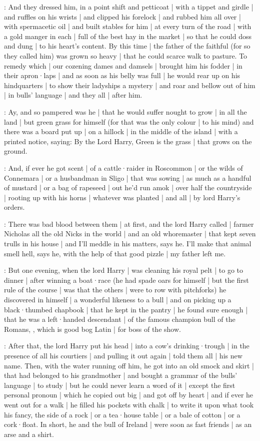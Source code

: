 \madden:
And they dressed him,
in a point shift and petticoat |
with a tippet and girdle |
and ruffles on his wrists |
and clipped his forelock |
and rubbed him all over |
with spermacetic oil |
and built stables for him |
at every turn of the road |
with a gold manger in each |
full of the best hay in the market |
so that he could doss and dung |
to his heart's content.
By this time |
the father of the faithful
(for so they called him)
was grown so heavy |
that he could scarce walk to pasture.
To remedy which |
our cozening dames and damsels |
brought him his fodder |
in their apron·laps |
and as soon as his belly was full |
he would rear up on his hindquarters |
to show their ladyships a mystery |
and roar and bellow out of him |
in bulls' language |
and they all |
after him.

\lenehan:
Ay,
and so pampered was he |
that he would suffer nought to grow |
in all the land |
but green grass for himself
(for that was the only colour |
to his mind)
and there was a board put up |
on a hillock |
in the middle of the island |
with a printed notice,
saying:
By the Lord Harry,
Green is the grass |
that grows on the ground.

\dixon:
And,
if ever he got scent |
of a cattle·raider in Roscommon |
or the wilds of Connemara |
or a husbandman in Sligo |
that was sowing |
as much as a handful of mustard |
or a bag of rapeseed |
out he'd run amok |
over half the countryside |
rooting up with his horns |
whatever was planted |
and all |
by lord Harry's orders.

\lynch:
There was bad blood between them |
at first,
and the lord Harry called |
farmer Nicholas all the old Nicks in the world |
and an old whoremaster |
that kept seven trulls in his house |
and I'll meddle in his matters,
says he.
I'll make that animal smell hell,
says he,
with the help of that good pizzle |
my father left me.

\dixon:
But one evening,
when the lord Harry |
was cleaning his royal pelt |
to go to dinner |
after winning a boat·race
(he had spade oars for himself |
but the first rule of the course |
was that the others |
were to row with pitchforks)
he discovered in himself |
a wonderful likeness to a bull |
and on picking up a black·thumbed chapbook |
that he kept in the pantry |
he found sure enough |
that he was a left·handed descendant |
of the famous champion bull of the Romans,
,
which is good bog Latin |
for boss of the show.

\lynch:
After that,
the lord Harry put his head |
into a cow's drinking·trough |
in the presence of all his courtiers |
and pulling it out again |
told them all |
his new name.
Then,
with the water running off him,
he got into an old smock and skirt |
that had belonged to his grandmother |
and bought a grammar of the bulls' language |
to study |
but he could never learn a word of it |
except the first personal pronoun |
which he copied out big |
and got off by heart |
and if ever he went out for a walk |
he filled his pockets with chalk |
to write it upon what took his fancy,
the side of a rock |
or a tea·house table |
or a bale of cotton |
or a cork·float.
In short,
he and the bull of Ireland |
were soon as fast friends |
as an arse and a shirt.

